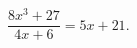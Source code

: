 \begin{ex}[type=equation]
	\begin{condition}
		$\dfrac{8x^3 + 27}{4x + 6} = 5x + 21.$
	\end{condition}
\end{ex}